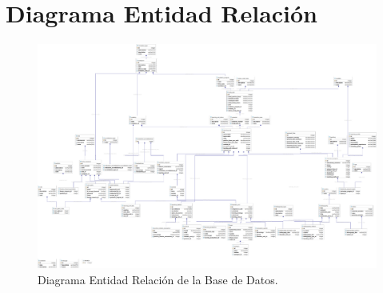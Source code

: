 \chapter{Diagrama Entidad Relaci\'on}
\begin{figure}
	\begin{center}
	\includegraphics[width=\textwidth]{images/DER/APMS.pdf}
	\caption{Diagrama Entidad Relaci\'on de la Base de Datos.}
	\end{center}
\end{figure}